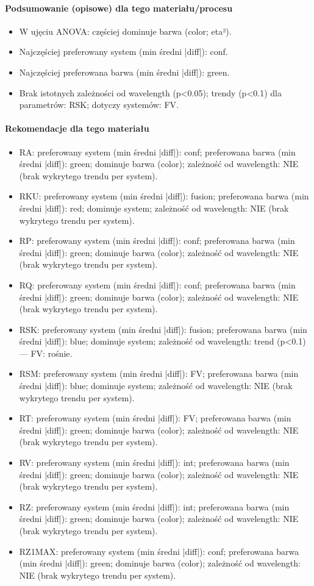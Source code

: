 \documentclass[
  10pt,
]{article}
\begin{document}
\paragraph{Podsumowanie (opisowe) dla tego materiału/procesu}
\begin{itemize}
\item W ujęciu ANOVA: częściej dominuje barwa (color; eta²).
\item Najczęściej preferowany system (min średni |diff|): conf.
\item Najczęściej preferowana barwa (min średni |diff|): green.
\item Brak istotnych zależności od wavelength (p<0.05); trendy (p<0.1) dla parametrów: RSK; dotyczy systemów: FV.
\end{itemize}
\paragraph{Rekomendacje dla tego materiału}
\begin{itemize}
\item RA: preferowany system (min średni |diff|): conf; preferowana barwa (min średni |diff|): green; dominuje barwa (color); zależność od wavelength: NIE (brak wykrytego trendu per system).
\item RKU: preferowany system (min średni |diff|): fusion; preferowana barwa (min średni |diff|): red; dominuje system; zależność od wavelength: NIE (brak wykrytego trendu per system).
\item RP: preferowany system (min średni |diff|): conf; preferowana barwa (min średni |diff|): green; dominuje barwa (color); zależność od wavelength: NIE (brak wykrytego trendu per system).
\item RQ: preferowany system (min średni |diff|): conf; preferowana barwa (min średni |diff|): green; dominuje barwa (color); zależność od wavelength: NIE (brak wykrytego trendu per system).
\item RSK: preferowany system (min średni |diff|): fusion; preferowana barwa (min średni |diff|): blue; dominuje system; zależność od wavelength: trend (p<0.1) — FV: rośnie.
\item RSM: preferowany system (min średni |diff|): FV; preferowana barwa (min średni |diff|): blue; dominuje system; zależność od wavelength: NIE (brak wykrytego trendu per system).
\item RT: preferowany system (min średni |diff|): FV; preferowana barwa (min średni |diff|): green; dominuje barwa (color); zależność od wavelength: NIE (brak wykrytego trendu per system).
\item RV: preferowany system (min średni |diff|): int; preferowana barwa (min średni |diff|): green; dominuje barwa (color); zależność od wavelength: NIE (brak wykrytego trendu per system).
\item RZ: preferowany system (min średni |diff|): int; preferowana barwa (min średni |diff|): green; dominuje barwa (color); zależność od wavelength: NIE (brak wykrytego trendu per system).
\item RZ1MAX: preferowany system (min średni |diff|): conf; preferowana barwa (min średni |diff|): green; dominuje barwa (color); zależność od wavelength: NIE (brak wykrytego trendu per system).
\end{itemize}
\end{document}
